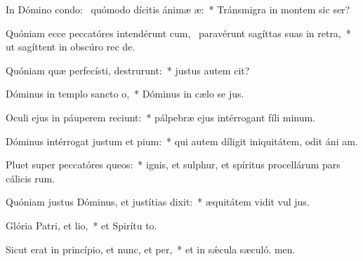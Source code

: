 \item In Dómino condo:~\pscross{} quómodo dícitis ánimæ æ:~* Tránsmigra in montem sic ser?
\item Quóniam ecce peccatóres intendérunt cum,~\pscross{} paravérunt sagíttas suas in retra,~* ut sagíttent in obscúro rec de.
\item Quóniam quæ perfecísti, destrurunt:~* justus autem  cit?
\item Dóminus in templo sancto o,~* Dóminus in cælo se jus.
\item Oculi ejus in páuperem reciunt:~* pálpebræ ejus intérrogant fíli minum.
\item Dóminus intérrogat justum et pium:~* qui autem díligit iniquitátem, odit áni am.
\item Pluet super peccatóres queos:~* ignis, et sulphur, et spíritus procellárum pars cálicis rum.
\item Quóniam justus Dóminus, et justítias dixit:~* æquitátem vidit vul jus.
\item Glória Patri, et lio,~* et Spirítu to.
\item Sicut erat in princípio, et nunc, et per,~* et in sǽcula sæculó. men.
